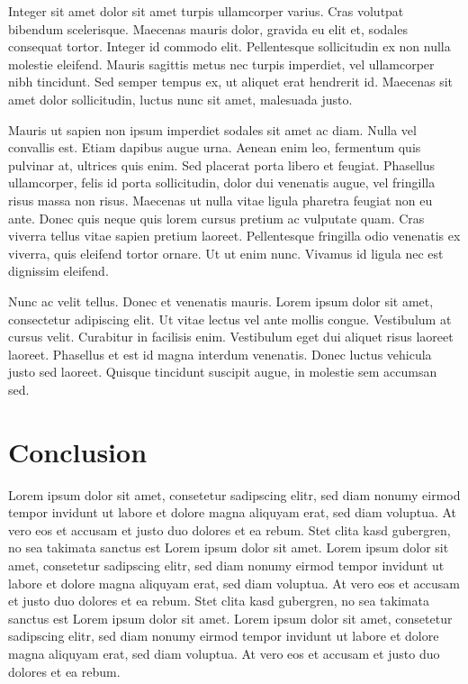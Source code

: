 \documentclass[journal]{vgtc}                %
\begin{document}
Integer sit amet dolor sit amet turpis ullamcorper varius. Cras volutpat bibendum scelerisque. Maecenas mauris dolor, gravida eu elit et, sodales consequat tortor. Integer id commodo elit. Pellentesque sollicitudin ex non nulla molestie eleifend. Mauris sagittis metus nec turpis imperdiet, vel ullamcorper nibh tincidunt. Sed semper tempus ex, ut aliquet erat hendrerit id. Maecenas sit amet dolor sollicitudin, luctus nunc sit amet, malesuada justo.

Mauris ut sapien non ipsum imperdiet sodales sit amet ac diam. Nulla vel convallis est. Etiam dapibus augue urna. Aenean enim leo, fermentum quis pulvinar at, ultrices quis enim. Sed placerat porta libero et feugiat. Phasellus ullamcorper, felis id porta sollicitudin, dolor dui venenatis augue, vel fringilla risus massa non risus. Maecenas ut nulla vitae ligula pharetra feugiat non eu ante. Donec quis neque quis lorem cursus pretium ac vulputate quam. Cras viverra tellus vitae sapien pretium laoreet. Pellentesque fringilla odio venenatis ex viverra, quis eleifend tortor ornare. Ut ut enim nunc. Vivamus id ligula nec est dignissim eleifend.

Nunc ac velit tellus. Donec et venenatis mauris. Lorem ipsum dolor sit amet, consectetur adipiscing elit. Ut vitae lectus vel ante mollis congue. Vestibulum at cursus velit. Curabitur in facilisis enim. Vestibulum eget dui aliquet risus laoreet laoreet. Phasellus et est id magna interdum venenatis. Donec luctus vehicula justo sed laoreet. Quisque tincidunt suscipit augue, in molestie sem accumsan sed.
\section{Conclusion}

Lorem ipsum dolor sit amet, consetetur sadipscing elitr, sed diam
nonumy eirmod tempor invidunt ut labore et dolore magna aliquyam erat,
sed diam voluptua. At vero eos et accusam et justo duo dolores et ea
rebum. Stet clita kasd gubergren, no sea takimata sanctus est Lorem
ipsum dolor sit amet. Lorem ipsum dolor sit amet, consetetur
sadipscing elitr, sed diam nonumy eirmod tempor invidunt ut labore et
dolore magna aliquyam erat, sed diam voluptua. At vero eos et accusam
et justo duo dolores et ea rebum. Stet clita kasd gubergren, no sea
takimata sanctus est Lorem ipsum dolor sit amet. Lorem ipsum dolor sit
amet, consetetur sadipscing elitr, sed diam nonumy eirmod tempor
invidunt ut labore et dolore magna aliquyam erat, sed diam
voluptua. At vero eos et accusam et justo duo dolores et ea
rebum.



%

%
%
%

\end{document}
